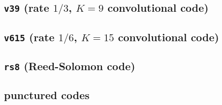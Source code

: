 \subsection{{\tt v39} (rate $1/3$, $K=9$ convolutional code)}
\label{module:fec:v39}

\subsection{{\tt v615} (rate $1/6$, $K=15$ convolutional code)}
\label{module:fec:v615}

\subsection{{\tt rs8} (Reed-Solomon code)}
\label{module:fec:rs8}

\subsection{punctured codes}
\label{module:fec:punctured}

